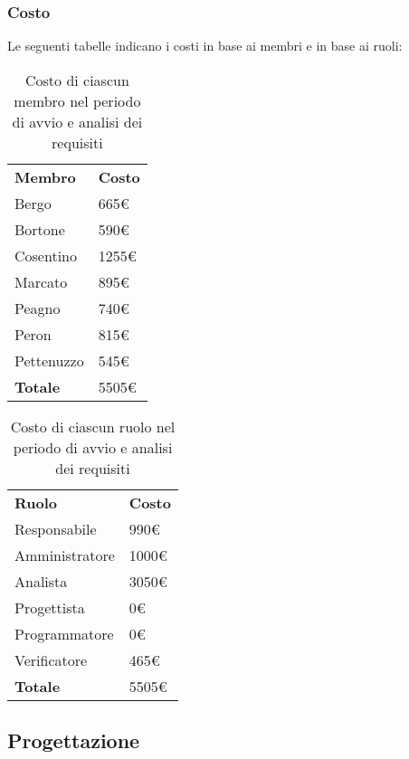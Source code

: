 	\subsubsection{Costo}
		Le seguenti tabelle indicano i costi in base ai membri e in base ai ruoli:
		\begin{table}[h]
		\centering		
		\begin{tabular}{| l | l |}
			\rowcolor{LightBlue}
			\textbf{\color{white}Membro}
			& \textbf{\color{white}Costo}\\
			
			Bergo & 665€\\
			Bortone & 590€\\
			Cosentino & 1255€\\
			Marcato & 895€\\
			Peagno & 740€\\
			Peron & 815€\\
			Pettenuzzo & 545€\\ \hline
			\textbf{Totale} & 5505€\\ \hline
		\end{tabular}
		\caption{Costo di ciascun membro nel periodo di avvio e analisi dei requisiti}
		\end{table}
		
		\begin{table}[h]
		\centering		
		\begin{tabular}{| l | l |}
			\rowcolor{LightBlue}
			\textbf{\color{white}Ruolo}
			& \textbf{\color{white}Costo}\\
			
			Responsabile 		& 990€\\
			Amministratore 	& 1000€\\
			Analista 				& 3050€\\			
			Progettista 			& 0€\\
			Programmatore 		& 0€\\
			Verificatore 		& 465€\\ \hline
			\textbf{Totale} 	& 5505€\\ \hline
		\end{tabular}
		\caption{Costo di ciascun ruolo nel periodo di avvio e analisi dei requisiti}
		\end{table}

\newpage
\subsection{Progettazione}
